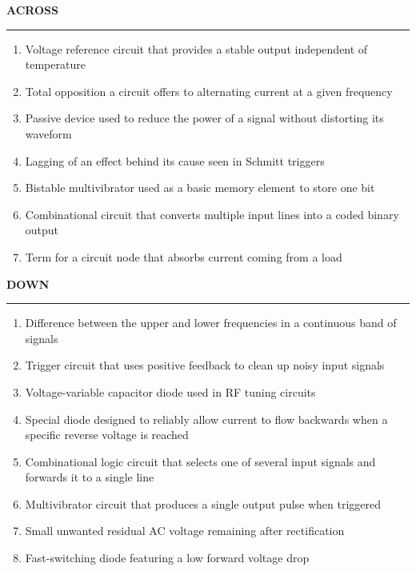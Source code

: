 \vspace{0.5em}
\noindent
\begin{minipage}[t]{0.485\textwidth}
  {\large\bfseries\rmfamily\color{IEEEblue} ACROSS}\par
  \vspace{0.2em}
  {\color{IEEEorange}\rule{\linewidth}{1pt}}\par
  \smallskip
  \footnotesize
  \begin{enumerate}[leftmargin=2.1em,itemsep=3pt,topsep=0pt,parsep=0pt]
    \item[\textbf{5.}] Voltage reference circuit that provides a stable output independent of temperature
    \item[\textbf{6.}] Total opposition a circuit offers to alternating current at a given frequency
    \item[\textbf{9.}] Passive device used to reduce the power of a signal without distorting its waveform
    \item[\textbf{11.}] Lagging of an effect behind its cause seen in Schmitt triggers
    \item[\textbf{13.}] Bistable multivibrator used as a basic memory element to store one bit
    \item[\textbf{14.}] Combinational circuit that converts multiple input lines into a coded binary output
    \item[\textbf{15.}] Term for a circuit node that absorbs current coming from a load
  \end{enumerate}
\end{minipage}%
\hfill
\begin{minipage}[t]{0.485\textwidth}
  {\large\bfseries\rmfamily\color{IEEEblue} DOWN}\par
  \vspace{0.2em}
  {\color{IEEEorange}\rule{\linewidth}{1pt}}\par
  \smallskip
  \footnotesize
  \begin{enumerate}[leftmargin=2.1em,itemsep=3pt,topsep=0pt,parsep=0pt]
    \item[\textbf{1.}] Difference between the upper and lower frequencies in a continuous band of signals
    \item[\textbf{2.}] Trigger circuit that uses positive feedback to clean up noisy input signals
    \item[\textbf{3.}] Voltage-variable capacitor diode used in RF tuning circuits
    \item[\textbf{4.}] Special diode designed to reliably allow current to flow backwards when a specific reverse voltage is reached
    \item[\textbf{7.}] Combinational logic circuit that selects one of several input signals and forwards it to a single line
    \item[\textbf{8.}] Multivibrator circuit that produces a single output pulse when triggered
    \item[\textbf{10.}] Small unwanted residual AC voltage remaining after rectification
    \item[\textbf{12.}] Fast-switching diode featuring a low forward voltage drop
  \end{enumerate}
\end{minipage}

